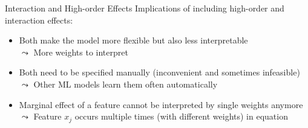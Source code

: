 \documentclass[11pt,compress,t,notes=noshow, aspectratio=169, xcolor=table]{beamer}
\begin{document}
\begin{frame}{Interaction and High-order Effects}
\pause
Implications of including high-order and interaction effects: 
\begin{itemize}
    \item Both make the model more flexible but also less interpretable\\
    $\leadsto$ More weights to interpret
    \item Both need to be specified manually (inconvenient and sometimes infeasible)\\
    $\leadsto$ Other ML models learn them often automatically
    \item Marginal effect of a feature cannot be interpreted by single weights anymore\\
$\leadsto$ Feature $x_j$ occurs multiple times (with different weights) in equation
\end{itemize}


\end{frame}


\end{document}
